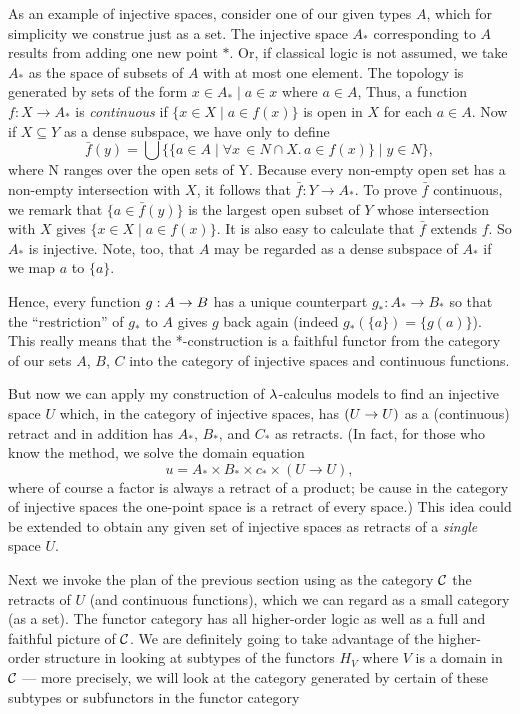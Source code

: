 As an example of injective spaces, consider one of our given types $A$, which for
simplicity we construe just as a set. The injective space $A_*$ corresponding to $A$
results from adding one new point $*$. Or, if classical logic is not assumed, we take
$A_*$ as the space of subsets of $A$ with at most one element. The topology is generated
by sets of the form ${x \in A_* \mid  a \in x}$ where $a \in A$, Thus, a function $f : X
\to A_*$ is {\it continuous} if $\{x \in X \mid a \in f(x)\}$ is open in $X$ for each $a
\in A$. Now if $X \subseteq Y$ as a dense subspace, we have only to define
$$
\bar{f}(y) = \bigcup \bigl\{\{a \in A \mid \forall x\, \in N \cap X.\, a \in f(x)\} \mid y \in N\bigr \},
$$
where N ranges over the open sets of Y. Because every non-empty open set has a non-empty
intersection with $X$, it follows that $\bar{f} : Y \to A_*$. To prove $\bar{f}$
continuous, we remark that $\{a \in \bar{f}(y)\}$ is the largest open subset of $Y$ whose
intersection with $X$ gives $\{x \in X \mid a \in f(x)\}$. It is also easy to calculate
that $\bar{f}$ extends $f$. So $A_*$ is injective. Note, too, that $A$ may be regarded as
a dense subspace of $A_*$ if we map $a$ to $\{a\}$.

Hence, every function $g:A \rightarrow B$ has a unique counterpart $g_* : A_*\to B_*$ so that the
``restriction'' of $g_*$ to $A$ gives $g$ back again (indeed $g_*(\{a\}) = \{g(a)\}$).
This really means that the *-construction is a faithful functor from the category of our
sets $A$, $B$, $C$ into the category of injective spaces and continuous functions.

But now we can apply my construction of $\lambda$-calculus models to find an injective space
$U$ which, in the category of injective spaces, has $(U\rightarrow U)$ as a (continuous) retract and in
addition has $A_*$, $B_*$, and $C_*$ as retracts. (In fact, for those who know the method,
we solve the domain equation
$$
u = A_* \times B_* \times c_* \times (U \to U),
$$
where of course a factor is always a retract of a product; be cause in the category of
injective spaces the one-point space is a retract of every space.) This idea could be
extended to obtain any given set of injective spaces as retracts of a {\it single} space
$U$.

Next we invoke the plan of the previous section using as the category $\mathcal C$ the retracts of
$U$ (and continuous functions), which we can regard as a small category (as a set). The
functor category has all higher-order logic as well as a full and faithful picture of
$\mathcal C$. We are definitely going to take advantage of the higher-order structure in looking
at subtypes of the functors $H_V$ where $V$ is a domain in $\mathcal C$ --- more precisely, we
will look at the category generated by certain of these subtypes or subfunctors in the
functor category

